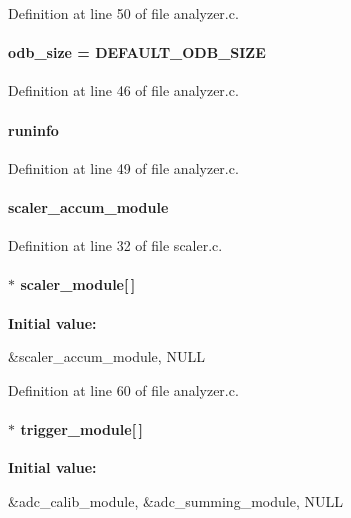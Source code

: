 Definition at line 50 of file analyzer.c.
\paragraph[{odb\_\-size}]{ {\bf odb\_\-size} = DEFAULT\_\-ODB\_\-SIZE}\hfill\label{analyzer_8c_a7503268889a084b74a968787ffc025b7}


Definition at line 46 of file analyzer.c.
\paragraph[{runinfo}]{ {\bf runinfo}}\hfill\label{analyzer_8c_ade46d29add32a0b6910ebc8da0fea69b}


Definition at line 49 of file analyzer.c.
\paragraph[{scaler\_\-accum\_\-module}]{ {\bf scaler\_\-accum\_\-module}}\hfill\label{analyzer_8c_a4c8b24b6a38f43da323289e5241002d6}


Definition at line 32 of file scaler.c.
\paragraph[{scaler\_\-module}]{$\ast$ {\bf scaler\_\-module}\mbox{[}$\,$\mbox{]}}\hfill\label{analyzer_8c_a87afc2caed93b39a62c35048c78cb165}
{\bfseries Initial value:}
\begin{DoxyCode}
 {
   &scaler_accum_module,
   NULL
}
\end{DoxyCode}


Definition at line 60 of file analyzer.c.
\paragraph[{trigger\_\-module}]{$\ast$ {\bf trigger\_\-module}\mbox{[}$\,$\mbox{]}}\hfill\label{analyzer_8c_a7fb218f74c1e8f307575341fd4d8ba3f}
{\bfseries Initial value:}
\begin{DoxyCode}
 {
   &adc_calib_module,
   &adc_summing_module,
   NULL
}
\end{DoxyCode}



